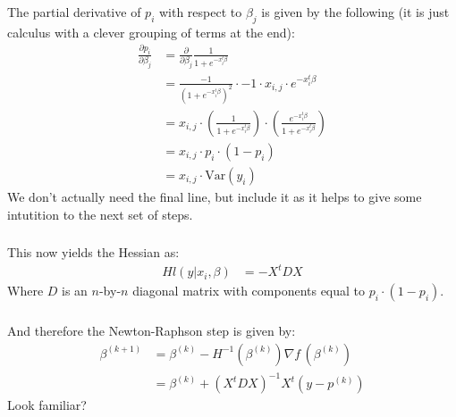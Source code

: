 \begin{frame}[fragile] \frametitle{}

The partial derivative of $p_i$ with respect to $\beta_j$ is
given by the following (it is just calculus with a clever
grouping of terms at the end):
\begin{align*}
\frac{\partial p_i}{\partial \beta_j}
&= \frac{\partial}{\partial \beta_j} \frac{1}{1+e^{-x_i^t \beta}} \\
&= \frac{-1}{(1+e^{-x_i^t \beta})^2} \cdot -1 \cdot x_{i,j} \cdot e^{-x_i^t \beta} \\
&= x_{i,j} \cdot \left(\frac{1}{1+e^{-x_i^t \beta}} \right) \cdot \left(\frac{e^{-x_i^t \beta}}{1+e^{-x_i^t \beta}} \right) \\
&= x_{i,j} \cdot p_i \cdot (1 - p_i) \\
&= x_{i,j} \cdot \text{Var}(y_i)
\end{align*}
\pause We don't actually need the final line, but include it as it
helps to give some intutition to the next set of steps.

\end{frame}


\begin{frame}[fragile] \frametitle{}

This now yields the Hessian as:
\begin{align*}
H l(y | x_i, \beta) &= - X^t D X
\end{align*}
Where $D$ is an $n$-by-$n$ diagonal matrix with components equal
to $p_i\cdot(1-p_i)$.

\end{frame}

\begin{frame}[fragile] \frametitle{}

And therefore the Newton-Raphson step is given by:
\begin{align*}
\beta^{(k+1)} &= \beta^{(k)} - H^{-1}(\beta^{(k)}) \nabla f\,(\beta^{(k)}) \\
&= \beta^{(k)} + (X^t D X)^{-1} X^t (y - p^{(k)})
\end{align*}
\pause Look familiar?

\end{frame}

